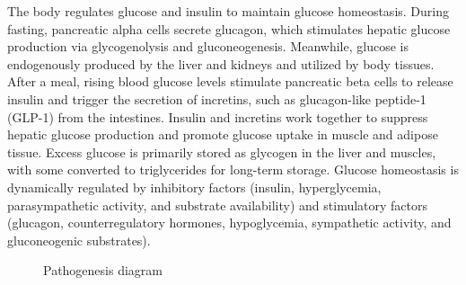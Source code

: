 \documentclass[
  a4paper,
  headsepline=true,
  open=any]{scrbook}
\begin{document}
The body regulates glucose and insulin to maintain glucose homeostasis.
During fasting, pancreatic alpha cells secrete glucagon, which
stimulates hepatic glucose production via glycogenolysis and
gluconeogenesis. Meanwhile, glucose is endogenously produced by the
liver and kidneys and utilized by body tissues. After a meal, rising
blood glucose levels stimulate pancreatic beta cells to release insulin
and trigger the secretion of incretins, such as glucagon-like peptide-1
(GLP-1) from the intestines. Insulin and incretins work together to
suppress hepatic glucose production and promote glucose uptake in muscle
and adipose tissue. Excess glucose is primarily stored as glycogen in
the liver and muscles, with some converted to triglycerides for
long-term storage. Glucose homeostasis is dynamically regulated by
inhibitory factors (insulin, hyperglycemia, parasympathetic activity,
and substrate availability) and stimulatory factors (glucagon,
counterregulatory hormones, hypoglycemia, sympathetic activity, and
gluconeogenic substrates).

\begin{figure}

\begin{minipage}[t]{\linewidth}

{\centering 


\caption{Pathogenesis diagram}

}

\end{minipage}%

\end{figure}
\end{document}
